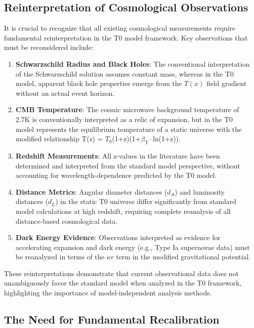 \documentclass[12pt,a4paper]{article}
\newcommand{\Tfield}{T(x)}
\newcommand{\betaT}{\beta_{\text{T}}}
\newcommand{\Tzero}{T_0}
\begin{document}
	\subsection{Reinterpretation of Cosmological Observations}
	
	It is crucial to recognize that all existing cosmological measurements require fundamental reinterpretation in the T0 model framework. Key observations that must be reconsidered include:
	
	\begin{enumerate}
		\item \textbf{Schwarzschild Radius and Black Holes}: The conventional interpretation of the Schwarzschild solution assumes constant mass, whereas in the T0 model, apparent black hole properties emerge from the $\Tfield$ field gradient without an actual event horizon.
		
		\item \textbf{CMB Temperature}: The cosmic microwave background temperature of 2.7K is conventionally interpreted as a relic of expansion, but in the T0 model represents the equilibrium temperature of a static universe with the modified relationship T(z) = $\Tzero$(1+z)(1+$\betaT \cdot$ln(1+z)).
		
		\item \textbf{Redshift Measurements}: All z-values in the literature have been determined and interpreted from the standard model perspective, without accounting for wavelength-dependence predicted by the T0 model.
		
		\item \textbf{Distance Metrics}: Angular diameter distances ($d_A$) and luminosity distances ($d_L$) in the static T0 universe differ significantly from standard model calculations at high redshift, requiring complete reanalysis of all distance-based cosmological data.
		
		\item \textbf{Dark Energy Evidence}: Observations interpreted as evidence for accelerating expansion and dark energy (e.g., Type Ia supernovae data) must be reanalyzed in terms of the $\kappa r$ term in the modified gravitational potential.
	\end{enumerate}
	
	These reinterpretations demonstrate that current observational data does not unambiguously favor the standard model when analyzed in the T0 framework, highlighting the importance of model-independent analysis methods.
	
	\subsection{The Need for Fundamental Recalibration}
	
\end{document}
